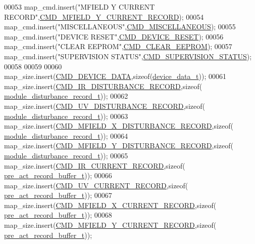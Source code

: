 \begin{DoxyCode}
00053     map\_cmd.insert(\textcolor{stringliteral}{"MFIELD Y  CURRENT RECORD"},\hyperlink{a00086_a8ddac7f7a2a90f2d8535af02e338b1bf}{CMD\_MFIELD\_Y\_CURRENT\_RECORD});
00054     map\_cmd.insert(\textcolor{stringliteral}{"MISCELLANEOUS"},\hyperlink{a00086_a1c028104d44ece3aca38373da0345c04}{CMD\_MISCELLANEOUS});
00055     map\_cmd.insert(\textcolor{stringliteral}{"DEVICE RESET"},\hyperlink{a00086_ac4c8a78ea50054745a0ac0792baa7657}{CMD\_DEVICE\_RESET});
00056     map\_cmd.insert(\textcolor{stringliteral}{"CLEAR EEPROM"},\hyperlink{a00086_a9084e0a84e73318b6fad9841fb4d4f98}{CMD\_CLEAR\_EEPROM});
00057     map\_cmd.insert(\textcolor{stringliteral}{"SUPERVISION STATUS"},\hyperlink{a00086_ad6af9210ac0903986f3ac3e55c6816a3}{CMD\_SUPERVISION\_STATUS});
00058 
00059 
00060     map\_size.insert(\hyperlink{a00086_a4412fcb90fb9171d432a624428881e70}{CMD\_DEVICE\_DATA},\textcolor{keyword}{sizeof}(\hyperlink{a00006_a95029dff9c90f6a6907353ba86eb3f33}{device\_data\_t}));
00061     map\_size.insert(\hyperlink{a00086_ad37cd290161f0a245d189c3f4e014d4e}{CMD\_IR\_DISTURBANCE\_RECORD},\textcolor{keyword}{sizeof}(
      \hyperlink{a00019}{module\_disturbance\_record\_t}));
00062     map\_size.insert(\hyperlink{a00086_ae45bb46748497c6a117beb1e93072d83}{CMD\_UV\_DISTURBANCE\_RECORD},\textcolor{keyword}{sizeof}(
      \hyperlink{a00019}{module\_disturbance\_record\_t}));
00063     map\_size.insert(\hyperlink{a00086_ab84aea346a3f75b58f8bda67b8ae9be0}{CMD\_MFIELD\_X\_DISTURBANCE\_RECORD},\textcolor{keyword}{sizeof}(
      \hyperlink{a00019}{module\_disturbance\_record\_t}));
00064     map\_size.insert(\hyperlink{a00086_af77e9c0ad32b3cc50d61992d4b64a831}{CMD\_MFIELD\_Y\_DISTURBANCE\_RECORD},\textcolor{keyword}{sizeof}(
      \hyperlink{a00019}{module\_disturbance\_record\_t}));
00065     map\_size.insert(\hyperlink{a00086_a4dcce4fd3ff29eb6782f3228901f99cf}{CMD\_IR\_CURRENT\_RECORD},\textcolor{keyword}{sizeof}(
      \hyperlink{a00006_dc/d52/a00183}{pre\_act\_record\_buffer\_t}));
00066     map\_size.insert(\hyperlink{a00086_ab0e0364ddc2d95d1e5b51a3e3ff50918}{CMD\_UV\_CURRENT\_RECORD},\textcolor{keyword}{sizeof}(
      \hyperlink{a00006_dc/d52/a00183}{pre\_act\_record\_buffer\_t}));
00067     map\_size.insert(\hyperlink{a00086_ab796345ffdbc6a240b67b56583bb77c6}{CMD\_MFIELD\_X\_CURRENT\_RECORD},\textcolor{keyword}{sizeof}(
      \hyperlink{a00006_dc/d52/a00183}{pre\_act\_record\_buffer\_t}));
00068     map\_size.insert(\hyperlink{a00086_a8ddac7f7a2a90f2d8535af02e338b1bf}{CMD\_MFIELD\_Y\_CURRENT\_RECORD},\textcolor{keyword}{sizeof}(
      \hyperlink{a00006_dc/d52/a00183}{pre\_act\_record\_buffer\_t}));

\end{DoxyCode}
